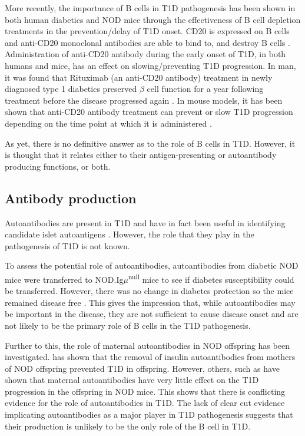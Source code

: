 More recently, the importance of B cells in T1D pathogenesis has been shown in both human diabetics and NOD mice through the effectiveness of B cell depletion treatments in the prevention/delay of T1D onset.
CD20 is expressed on B cells and anti-CD20 monoclonal antibodies are able to bind to, and destroy B cells \citep{Pescovitz2006}.
Administration of anti-CD20 antibody during the early onset of T1D, in both humans and mice, has an effect on slowing/preventing T1D progression.
In man, it was found that Rituximab (an anti-CD20 antibody) treatment in newly diagnosed type 1 diabetics preserved $\beta$ cell function for a year following treatment before the disease progressed again \citep{Pescovitz2009}.
In mouse models, it has been shown that anti-CD20 antibody treatment can prevent or slow T1D progression depending on the time point at which it is administered \citep{Xiu2008}.

As yet, there is no definitive answer as to the role of B cells in T1D.
However, it is thought that it relates either to their antigen-presenting or autoantibody producing functions, or both.

\subsection{Antibody production}

Autoantibodies are present in T1D and have in fact been useful in identifying candidate islet autoantigens \citep{Roep2012}.
However, the role that they play in the pathogenesis of T1D is not known.

To assess the potential role of autoantibodies, autoantibodies from diabetic NOD mice were transferred to NOD.Ig$\mu$\textsuperscript{null} mice to see if diabetes susceptibility could be transferred.
However, there was no change in diabetes protection so the mice remained disease free \citep{Serreze1998}.
This gives the impression that, while autoantibodies may be important in the disease, they are not sufficient to cause disease onset and are not likely to be the primary role of B cells in the T1D pathogenesis.

Further to this, the role of maternal autoantibodies in NOD offspring has been investigated.
\citet{Greeley2002} has shown that the removal of insulin autoantibodies from mothers of NOD offspring prevented T1D in offspring.
However, others, such as \citet{Koczwara2004nods} have shown that maternal autoantibodies have very little effect on the T1D progression in the offspring in NOD mice.
This shows that there is conflicting evidence for the role of autoantibodies in T1D.
The lack of clear cut evidence implicating autoantibodies as a major player in T1D pathogenesis suggests that their production is unlikely to be the only role of the B cell in T1D.

